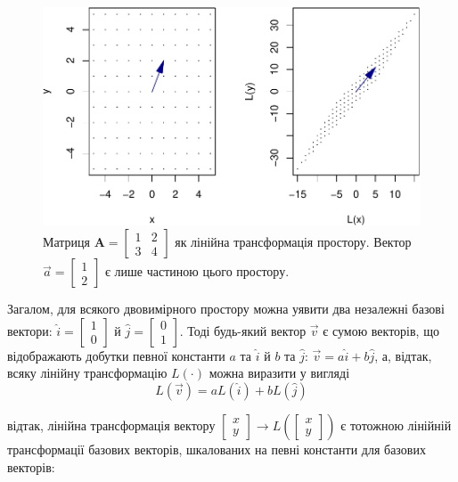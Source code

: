 \documentclass[
  11pt,
]{book}
\begin{document}
\begin{figure}
\centering
\includegraphics{bookdown-demo_files/figure-latex/fig-3-8-1.pdf}
\caption{Матриця
\(\mathbf{A} = \begin{bmatrix} 1 & 2 \\ 3 & 4 \end{bmatrix}\) як лінійна
трансформація простору. Вектор
\(\vec{a} = \begin{bmatrix} 1 \\ 2 \end{bmatrix}\) є лише частиною цього
простору.}
\end{figure}

Загалом, для всякого двовимірного простору можна уявити два незалежні
базові вектори: \(\hat{i} = \begin{bmatrix} 1 \\ 0 \end{bmatrix}\) й
\(\hat{j} = \begin{bmatrix} 0 \\ 1 \end{bmatrix}\). Тоді будь-який
вектор \(\vec{v}\) є сумою векторів, що відображають добутки певної
константи \(a\) та \(\hat{i}\) й \(b\) та \(\hat{j}\):
\(\vec{v} = a \hat{i} + b \hat{j}\), а, відтак, всяку лінійну
трансформацію \(L(\cdot)\) можна виразити у вигляді
\[L(\vec{v}) = a L(\hat{i}) + b L(\hat{j})\]

відтак, лінійна трансформація вектору
\(\begin{bmatrix} x \\ y \end{bmatrix} \rightarrow L \left( \begin{bmatrix} x \\ y \end{bmatrix} \right)\)
є тотожною лінійній трансформації базових векторів, шкалованих на певні
константи для базових векторів:
\end{document}
